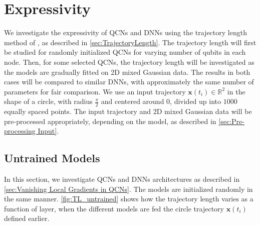 \section{Expressivity}\label{sec:Expressivity}
We investigate the expressivity of QCNs and DNNs using the trajectory length method of \citet{raghu2017expressive}, as described in \autoref{sec:TrajectoryLength}. The trajectory length will first be  studied for randomly initialized QCNs for varying number of qubits in each node. Then, for some selected QCNs, the trajectory length will be investigated as the models are gradually fitted on 2D mixed Gaussian data. The results in both cases will be compared to similar DNNs, with approximately the same number of parameters for fair comparison. We use an input trajectory $\boldsymbol{x}(t_i) \in \mathbb{R}^2$ in the shape of a circle, with radius $\frac{\pi}{2}$ and centered around $0$, divided up into $1000$ equally spaced points. The input trajectory and 2D mixed Gaussian data will be pre-processed appropriately, depending on the model, as described in \autoref{sec:Pre-processing Input}. 

\subsection{Untrained Models}\label{sec:Untrained Models}

In this section, we investigate QCNs and DNNs architectures as described in \autoref{sec:Vanishing Local Gradients in QCNs}. 
The models are initialized randomly in the same manner. \autoref{fig:TL_untrained} shows how the trajectory length varies as a function of layer, when the different models are fed the circle trajectory $\boldsymbol{x}(t_i)$ defined earlier.


